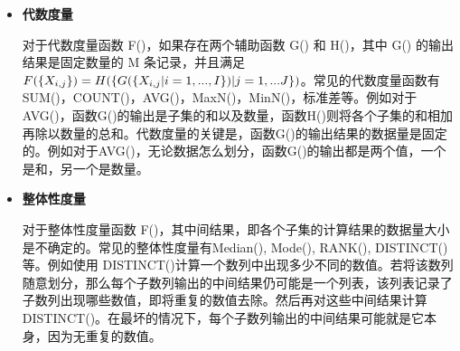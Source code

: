 \begin{itemize}


\item \textbf{代数度量}

对于代数度量函数 F()，如果存在两个辅助函数 G() 和 H()，其中 G() 的输出结果是固定数量的 M 条记录，并且满足$F(\text\{ {X}_{i,j} \text\}) = H(\text\{ G(\text\{ {X}_{i,j}|i=1,...,I \text\})|j=1,...J \text\})$。常见的代数度量函数有SUM()，COUNT()，AVG()，MaxN()，MinN()，标准差等。例如对于AVG()，函数G()的输出是子集的和以及数量，函数H()则将各个子集的和相加再除以数量的总和。代数度量的关键是，函数G()的输出结果的数据量是固定的。例如对于AVG()，无论数据怎么划分，函数G()的输出都是两个值，一个是和，另一个是数量。

\item \textbf{整体性度量}

对于整体性度量函数 F()，其中间结果，即各个子集的计算结果的数据量大小是不确定的。常见的整体性度量有Median(), Mode(), RANK(), DISTINCT()等。例如使用 DISTINCT()计算一个数列中出现多少不同的数值。若将该数列随意划分，那么每个子数列输出的中间结果仍可能是一个列表，该列表记录了子数列出现哪些数值，即将重复的数值去除。然后再对这些中间结果计算 DISTINCT()。在最坏的情况下，每个子数列输出的中间结果可能就是它本身，因为无重复的数值。

\end{itemize}





